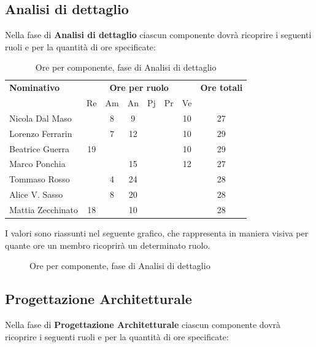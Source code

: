 \subsection{Analisi di dettaglio}
Nella fase di \textbf{Analisi di dettaglio} ciascun componente dovrà ricoprire i seguenti ruoli e per la quantità di ore specificate:

\begin{table}[H]
	\centering
	\begin{tabular}{|l|c|c|c|c|c|c|c|}
		\hline
		\textbf{Nominativo} & 
		\multicolumn{6}{c|}{\textbf{Ore per ruolo}} & 
		\textbf{Ore totali} \\
		& Re & Am & An & Pj & Pr & Ve & \\
		\hline
		Nicola Dal Maso & & 8 & 9 & & & 10 & 27 \\
		Lorenzo Ferrarin & & 7 & 12 & & & 10 & 29 \\
		Beatrice Guerra & 19 & & & & & 10 & 29 \\
		Marco Ponchia & & & 15 & & & 12 & 27 \\
		Tommaso Rosso & & 4 & 24 & & & & 28 \\
		Alice V. Sasso & & 8 & 20 & & & & 28 \\
		Mattia Zecchinato & 18 & & 10 & & & & 28 \\
		\hline
	\end{tabular}
	\caption{Ore per componente, fase di Analisi di dettaglio}
\end{table}
I valori sono riassunti nel seguente grafico, che rappresenta in maniera visiva per quante ore un membro ricoprirà un determinato ruolo.
\begin{figure}[H]
	\centering
	\caption{Ore per componente, fase di Analisi di dettaglio}
\end{figure}

\subsection{Progettazione Architetturale}
Nella fase di \textbf{Progettazione Architetturale} ciascun componente dovrà ricoprire i seguenti ruoli e per la quantità di ore specificate:

